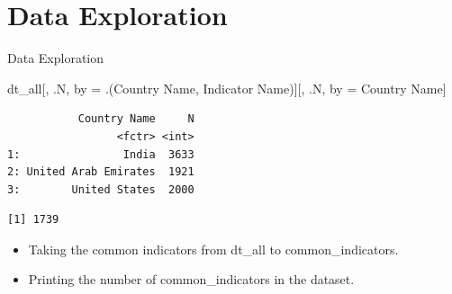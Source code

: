 \documentclass[
  8pt,
  ignorenonframetext,
]{beamer}
\newenvironment{Shaded}{\begin{snugshade}}{\end{snugshade}}
\newcommand{\AttributeTok}[1]{\textcolor[rgb]{0.40,0.45,0.13}{#1}}
\newcommand{\FunctionTok}[1]{\textcolor[rgb]{0.28,0.35,0.67}{#1}}
\newcommand{\NormalTok}[1]{\textcolor[rgb]{0.00,0.23,0.31}{#1}}
\newcommand{\OtherTok}[1]{\textcolor[rgb]{0.00,0.23,0.31}{#1}}
\newcommand{\SpecialCharTok}[1]{\textcolor[rgb]{0.37,0.37,0.37}{#1}}
\newcommand{\StringTok}[1]{\textcolor[rgb]{0.13,0.47,0.30}{#1}}
\begin{document}
\section{Data Exploration}\label{data-exploration}

\begin{frame}[fragile]{Data Exploration}
\begin{Shaded}
\begin{Highlighting}[]
\NormalTok{dt\_all[, .N, by }\OtherTok{=}\NormalTok{ .(}\StringTok{\textasciigrave{}}\AttributeTok{Country Name}\StringTok{\textasciigrave{}}\NormalTok{, }
                    \StringTok{\textasciigrave{}}\AttributeTok{Indicator Name}\StringTok{\textasciigrave{}}\NormalTok{)][, .N, by }\OtherTok{=} \StringTok{\textasciigrave{}}\AttributeTok{Country Name}\StringTok{\textasciigrave{}}\NormalTok{]}
\end{Highlighting}
\end{Shaded}

\begin{verbatim}
           Country Name     N
                 <fctr> <int>
1:                India  3633
2: United Arab Emirates  1921
3:        United States  2000
\end{verbatim}

\begin{Shaded}
\end{Shaded}

\begin{verbatim}
[1] 1739
\end{verbatim}

\begin{itemize}
\item
  Taking the common indicators from dt\_all to common\_indicators.
\item
  Printing the number of common\_indicators in the dataset.
\end{itemize}
\end{frame}
\end{document}
